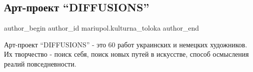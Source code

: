  
 
 
 
 

\subsection{Арт-проект \enquote{DIFFUSIONS}}
\label{sec:09_02_2019.fb.mariupol.kulturna_toloka.2.art_proekt_diffusions}

\ifcmt
 author_begin
   author_id mariupol.kulturna_toloka
 author_end
\fi

Арт-проект \enquote{DIFFUSIONS} - это 60 работ украинских и немецких художников. Их
творчество - поиск себя, поиск новых путей в искусстве, способ осмысления
реалий повседневности.
